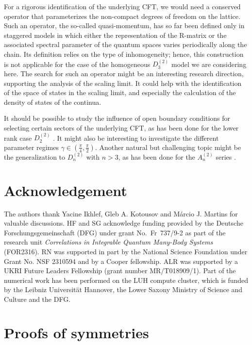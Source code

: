 \documentclass[12pt]{article}
\numberwithin{equation}{section}
\begin{document}
	For a rigorous identification of the underlying CFT, we would need a conserved operator that parameterizes the non-compact degrees of freedom on the lattice.  Such an operator, the so-called quasi-momentum, has so far been defined only in staggered models in which either the representation of the R-matrix \cite{FrHo17} or the associated spectral parameter \cite{IkJS12,KoLu23} of the quantum spaces varies periodically along the chain. Its definition relies on the type of inhomogeneity; hence, this construction is not applicable for the case of the homogeneous $D^{(2)}_3$ model we are considering here. The search for such an operator might be an interesting research direction, supporting the analysis of the scaling limit. It could help with the identification of the space of states in the scaling limit, and especially the calculation of the density of states of the continua. 
	
	It should be possible to study the influence of open boundary conditions for selecting certain sectors of the underlying CFT, as has been done for the lower rank case $D^{(2)}_2$ \cite{NePR19,RJS19,RPJS20,NeRe21a,RoJS21,FrGe22,FrGe23}. It might also be interesting to investigate the different parameter regimes $\gamma\in (\frac{\pi}{4},\frac{\pi}{2})$. Another natural but challenging topic might be the generalization to $D^{(2)}_n$ with $n>3$, as has been done for the $A^{(2)}_n$ series \cite{VeJS16a}. 
	\section*{Acknowledgement}
	The authors thank Yacine Ikhlef, Gleb A. Kotousov and M\'arcio J. Martins for valuable discussions. HF and SG acknowledge funding provided by the Deutsche Forschungsgemeinschaft (DFG) under grant No.\ Fr~737/9-2 as part of the research unit   \textit{Correlations in Integrable Quantum Many-Body Systems} (FOR2316). RN was supported in part by
	the National Science Foundation under Grant No. NSF 2310594 and by a Cooper fellowship. ALR was supported by a UKRI Future Leaders Fellowship (grant number MR/T018909/1). Part of  the numerical work has been performed on the LUH compute cluster, which is funded by the Leibniz Universität Hannover, the Lower Saxony Ministry of Science and Culture and the DFG. 	
	\appendix
	
	\section{Proofs of symmetries}\label{sec:proofs}
	
\end{document}
